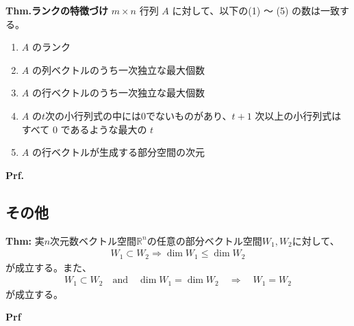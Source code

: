 \documentclass[a4paper,11pt]{jsarticle}
\numberwithin{equation}{section}
\begin{document}
\begin{itembox}[l]{\textbf{Thm.ランクの特徴づけ}}
    $m \times n$ 行列 $A$ に対して、以下の(1) 〜 (5) の数は一致する。
    \begin{enumerate}
        \item $A$ のランク
        \item $A$ の列ベクトルのうち一次独立な最大個数
        \item $A$ の行ベクトルのうち一次独立な最大個数
        \item $A$ の$t$次の小行列式の中には$0$でないものがあり、$t+1$ 次以上の小行列式はすべて $0$ であるような最大の $t$
        \item $A$ の行ベクトルが生成する部分空間の次元
    \end{enumerate}
\end{itembox}
\textbf{Prf.}\\



\subsection{その他}
\begin{itembox}[l]{\textbf{Thm:}}
  実$n$次元数ベクトル空間$\mathbb{R}^n$の任意の部分ベクトル空間$W_1, W_2$に対して、
  \begin{align}
    W_1 \subset W_2 \Rightarrow \dim W_1 \leq \dim W_2
  \end{align}
  が成立する。また、
  \begin{align}
    W_1 \subset W_2 \quad \text{and} \quad \dim W_1 = \dim W_2 \quad \Rightarrow \quad W_1 = W_2
  \end{align}
  が成立する。
\end{itembox}
\textbf{Prf}\\
\end{document}
